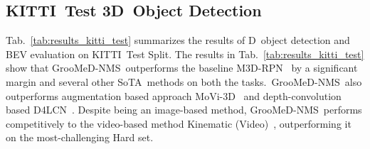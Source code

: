 \documentclass[final]{cvpr}
\newcommand{\myReferTable}[1]{Tab.~\ref{#1}}
\newcommand{\methodName}{GrooMeD-NMS}
\newcommand{\kinematicVideo}{Kinematic (Video)}
\newcommand{\threeD}{D}
\newcommand{\kitti}{KITTI}
\newcommand{\sota}{SoTA}
\begin{document}
\subsection{\kitti~Test 3D~Object Detection}\label{sec:results_kitti_test}
        \myReferTable{tab:results_kitti_test} summarizes the results of \threeD~object detection and BEV evaluation on \kitti~Test Split. The results in \myReferTable{tab:results_kitti_test} show that \methodName~outperforms the baseline M3D-RPN~\cite{brazil2019m3d} by a significant margin and several other \sota~methods on both the tasks.~\methodName~also outperforms augmentation based approach MoVi-3D~\cite{simonelli2020towards} and depth-convolution based D4LCN~\cite{ding2020learning}. 
        Despite being an image-based method, \methodName~performs competitively to the video-based method \kinematicVideo~\cite{brazil2020kinematic}, outperforming it on the most-challenging Hard set.
\end{document}
